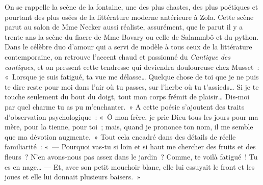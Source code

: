 \documentclass[french,twoside]{book} %
\begin{document}
On se rappelle la scène de la fontaine, une des plus chastes, des plus poétiques et pourtant des plus osées de la littérature moderne antérieure à Zola. Cette scène parut au salon de Mme Necker aussi réaliste, assurément, que le parut il y a trente ans la scène du fiacre de Mme Bovary ou celle de Salammbô et du python. Dans le célèbre duo d’amour qui a servi de modèle à tous ceux de la littérature contemporaine, on retrouve l’accent chaud et passionné du \emph{Cantique des cantiques}, et on pressent cette tendresse qui deviendra douloureuse chez Musset : « Lorsque je suis fatigué, ta vue me délasse… Quelque chose de toi que je ne puis te dire reste pour moi dans l’air où tu passes, sur l’herbe où tu t’assieds… Si je te touche seulement du bout du doigt, tout mon corps frémit de plaisir… Dis-moi par quel charme tu as pu m’enchanter. » A cette poésie s’ajoutent des traits d’observation psychologique : « Ô mon frère, je prie Dieu tous les jours pour ma mère, pour la tienne, pour toi ; mais, quand je prononce ton nom, il me semble que ma dévotion augmente. » Tout cela encadré dans des détails de réelle familiarité : « — Pourquoi vas-tu si loin et si haut me chercher des fruits et des fleurs ? N’en avons-nous pas assez dans le jardin ? Comme, te voilà fatigué ! Tu es en nage… — Et, avec son petit mouchoir blanc, elle lui essuyait le front et les joues et elle lui donnait plusieurs baisers. »\par
\par
\end{document}

